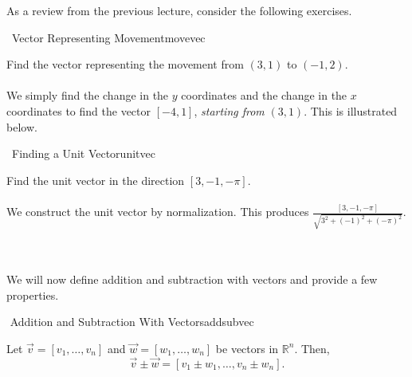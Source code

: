     As a review from the previous lecture, consider the following exercises.
    \begin{exercise}{\Difficulty\,\Difficulty\,\,Vector Representing Movement}{movevec}

        Find the vector representing the movement from \((3,1)\) to \((-1,2)\).
        \\
        \\
        We simply find the change in the \(y\) coordinates and the change in the \(x\) coordinates to find the vector \([-4, 1]\), \textit{starting from} \((3,1)\). This is illustrated below.
        \begin{center}
        \end{center}
        
    \end{exercise}
    \begin{exercise}{\Difficulty\,\Difficulty\,\,Finding a Unit Vector}{unitvec}

        Find the unit vector in the direction \([3,-1,-\pi]\).
        \\
        \\
        We construct the unit vector by normalization. This produces \(\frac{[3,-1,-\pi]}{\sqrt{3^2+(-1)^2+(-\pi)^2}}\).
    
    \end{exercise}
    \pagebreak
    \vphantom
    \\
    \\
    We will now define addition and subtraction with vectors and provide a few properties.
    \begin{definition}{\Stop\,\,Addition and Subtraction With Vectors}{addsubvec}

        Let \(\vec{v}=[v_1,\ldots,v_n]\) and \(\vec{w}=[w_1,\ldots,w_n]\) be vectors in \(\mathbb{R}^n\). Then,
        \begin{equation*}
            \vec{v}\pm\vec{w}=[v_1\pm w_1,\ldots,v_n\pm w_n].
        \end{equation*}
        
    \end{definition}
